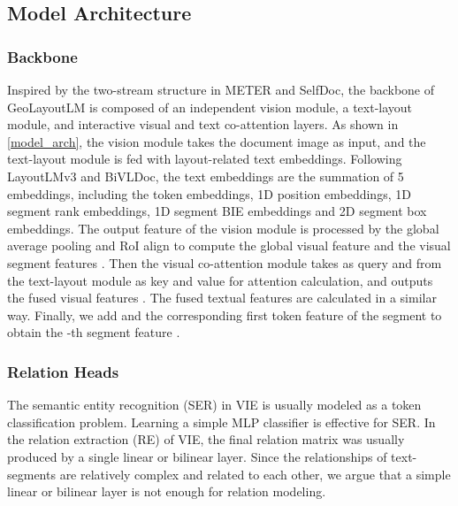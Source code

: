 \documentclass[10pt,twocolumn,letterpaper]{article}
\begin{document}
\subsection{Model Architecture}


\subsubsection{Backbone}
\label{backbone_detail}

Inspired by the two-stream structure in METER\cite{dou2022empirical} and SelfDoc\cite{li2021selfdoc}, the backbone of GeoLayoutLM is composed of an independent vision module, a text-layout module, and interactive visual and text co-attention layers. As shown in \cref{model_arch}, the vision module takes the document image as input, and the text-layout module is fed with layout-related text embeddings.
Following LayoutLMv3\cite{huang2022layoutlmv3} and BiVLDoc\cite{luo2022bivldoc}, the text embeddings are the summation of 5 embeddings, including the token embeddings, 1D position embeddings, 1D segment rank embeddings, 1D segment BIE embeddings and 2D segment box embeddings.
The output feature of the vision module is processed by the global average pooling\cite{lin2013network} and RoI align\cite{he2017mask} to compute the global visual feature  and the  visual segment features .
Then the visual co-attention module takes  as query and  from the text-layout module as key and value for attention calculation, and outputs the fused visual features .
The fused textual features  are calculated in a similar way.
Finally, we add  and the corresponding first token feature of the segment  to obtain the -th segment feature .







\subsubsection{Relation Heads}


The semantic entity recognition (SER) in VIE is usually modeled as a token classification problem.
Learning a simple MLP classifier is effective for SER\cite{huang2022layoutlmv3}.
In the relation extraction (RE) of VIE, the final relation matrix was usually produced by a single linear or bilinear layer\cite{li2021structext,hong2022bros}.
Since the relationships of text-segments are relatively complex and related to each other, we argue that a simple linear or bilinear layer is not enough for relation modeling.
\end{document}
